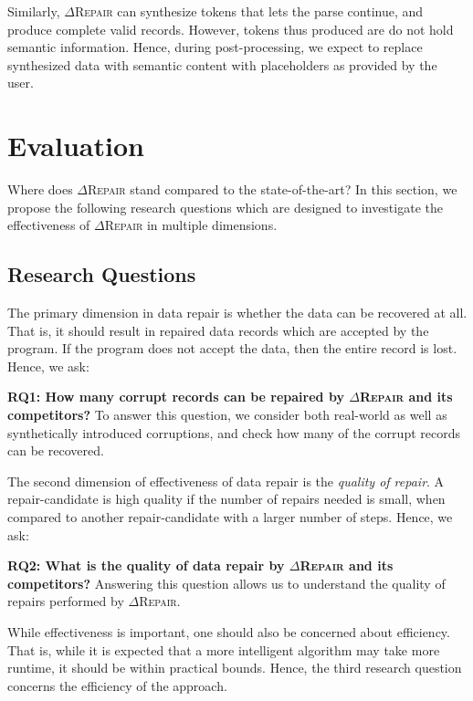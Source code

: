 \documentclass[sigconf,review,anonymous]{acmart}
\newcommand{\dtask}{data repair\xspace}
\newcommand{\approach}{\textsc{$\Delta$Repair}\xspace}
\newcommand{\drepair}{\approach}
\begin{document}
Similarly,
\drepair can synthesize tokens that lets the parse continue, and produce
complete valid records. However, tokens thus produced are do not hold semantic information.
Hence, during post-processing, we expect to replace synthesized data with
semantic content with placeholders as provided by the user.

\section{Evaluation}
\label{sec:evaluation}
Where does \drepair stand compared to the state-of-the-art? In this section, we
propose the following research questions which are designed to investigate the
effectiveness of \drepair in multiple dimensions.

\subsection{Research Questions}
The primary dimension in \dtask is whether the data can be recovered at all.
That is, it should result in repaired data records which are accepted by the
program. If the program does not accept the data, then the entire record
is lost.
Hence, we ask:

\noindent\textbf{RQ1: How many corrupt records can be repaired by \drepair and its competitors?}
To answer this question, we consider both real-world as well as synthetically
introduced corruptions, and check how many of the corrupt records can be
recovered.

The second dimension of effectiveness of \dtask is the \emph{quality of repair}.
A repair-candidate is high quality if the number of repairs needed is small,
when compared to another repair-candidate with a larger number of steps.
Hence, we ask:

\noindent\textbf{RQ2: What is the quality of \dtask by \drepair and its competitors?}
Answering this question allows us to understand the quality of repairs
performed by \drepair.

While effectiveness is important, one should also be concerned about efficiency.
That is, while it is expected that a more intelligent algorithm may take more
runtime, it should be within practical bounds. Hence, the third research
question concerns the efficiency of the approach.
\end{document}
